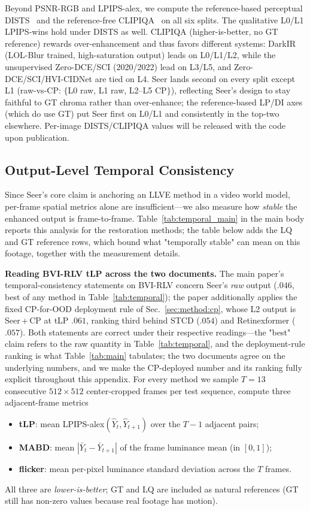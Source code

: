 Beyond PSNR-RGB and LPIPS-alex, we compute the reference-based perceptual DISTS~\citep{dists} and the reference-free CLIPIQA~\citep{clip_iqa} on all six splits. The qualitative L0/L1 LPIPS-wins hold under DISTS as well. CLIPIQA (higher-is-better, no GT reference) rewards over-enhancement and thus favors different systems: DarkIR (LOL-Blur trained, high-saturation output) leads on L0/L1/L2, while the unsupervised Zero-DCE/SCI (2020/2022) lead on L3/L5, and Zero-DCE/SCI/HVI-CIDNet are tied on L4. Seer lands second on every split except L1 (raw-vs-CP: $\{$L0 raw, L1 raw, L2--L5 CP$\}$), reflecting Seer's design to stay faithful to GT chroma rather than over-enhance; the reference-based LP/DI axes (which do use GT) put Seer first on L0/L1 and consistently in the top-two elsewhere. Per-image DISTS/CLIPIQA values will be released with the code upon publication.


\subsection{Output-Level Temporal Consistency}\label{app:temporal}

Since Seer's core claim is anchoring an LLVE method in a video world model, per-frame spatial metrics alone are insufficient---we also measure how \emph{stable} the enhanced output is frame-to-frame. Table~\ref{tab:temporal_main} in the main body reports this analysis for the restoration methods; the table below adds the LQ and GT reference rows, which bound what "temporally stable" can mean on this footage, together with the measurement details.

\noindent\textbf{Reading BVI-RLV tLP across the two documents.} The main paper's temporal-consistency statements on BVI-RLV concern Seer's \emph{raw} output ($.046$, best of any method in Table~\ref{tab:temporal}); the paper additionally applies the fixed CP-for-OOD deployment rule of Sec.~\ref{sec:method:cp}, whose L2 output is Seer\,+\,CP at tLP $.061$, ranking third behind STCD ($.054$) and Retinexformer ($.057$). Both statements are correct under their respective readings---the "best" claim refers to the raw quantity in Table~\ref{tab:temporal}, and the deployment-rule ranking is what Table~\ref{tab:main} tabulates; the two documents agree on the underlying numbers, and we make the CP-deployed number and its ranking fully explicit throughout this appendix. For every method we sample $T{=}13$ consecutive $512{\times}512$ center-cropped frames per test sequence, compute three adjacent-frame metrics
\begin{itemize}\itemsep0pt
\item \textbf{tLP}: mean LPIPS-alex$(\hat{Y}_{t},\hat{Y}_{t+1})$ over the $T{-}1$ adjacent pairs;
\item \textbf{MABD}: mean $|\bar{Y}_{t}-\bar{Y}_{t+1}|$ of the frame luminance mean (in $[0,1]$);
\item \textbf{flicker}: mean per-pixel luminance standard deviation across the $T$ frames.
\end{itemize}
All three are \emph{lower-is-better}; GT and LQ are included as natural references (GT still has non-zero values because real footage has motion).

